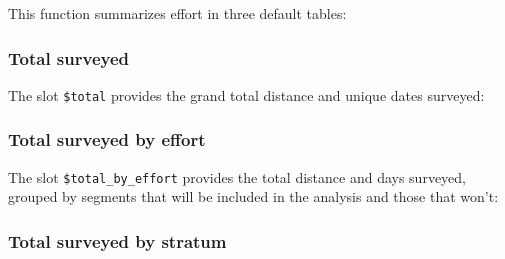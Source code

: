 \documentclass[
]{book}
\newenvironment{Shaded}{\begin{snugshade}}{\end{snugshade}}
\newcommand{\DataTypeTok}[1]{\textcolor[rgb]{0.13,0.29,0.53}{#1}}
\newcommand{\DecValTok}[1]{\textcolor[rgb]{0.00,0.00,0.81}{#1}}
\newcommand{\KeywordTok}[1]{\textcolor[rgb]{0.13,0.29,0.53}{\textbf{#1}}}
\newcommand{\NormalTok}[1]{#1}
\newcommand{\OperatorTok}[1]{\textcolor[rgb]{0.81,0.36,0.00}{\textbf{#1}}}
\newcommand{\StringTok}[1]{\textcolor[rgb]{0.31,0.60,0.02}{#1}}
\begin{document}
This function summarizes effort in three default tables:

\begin{Shaded}
\end{Shaded}

\hypertarget{total-surveyed}{%
\subsubsection*{Total surveyed}\label{total-surveyed}}

The slot \texttt{\$total} provides the grand total distance and unique dates surveyed:

\begin{Shaded}
\end{Shaded}

\hypertarget{total-surveyed-by-effort}{%
\subsubsection*{Total surveyed by effort}\label{total-surveyed-by-effort}}

The slot \texttt{\$total\_by\_effort} provides the total distance and days surveyed, grouped by segments that will be included in the analysis and those that won't:

\hypertarget{total-surveyed-by-stratum}{%
\subsubsection*{Total surveyed by stratum}\label{total-surveyed-by-stratum}}
\end{document}
